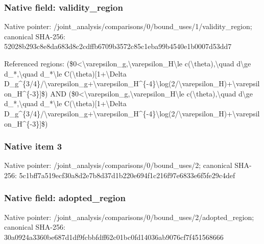 \documentclass[10pt,a4paper]{article}
\begin{document}
\subsubsection{Native field: validity\_\allowbreak{}region}
Native pointer: /joint\_\allowbreak{}analysis/comparisons/0/bound\_\allowbreak{}uses/1/validity\_\allowbreak{}region; canonical SHA-256: 52028b293c8e8da683d8c2cdffb6709b3572c85c1eba99b4540e1b0007d53dd7

\begingroup\raggedright\sloppy Referenced regions:\allowbreak{} (\$0<\textbackslash{}varepsilon\_\allowbreak{}g,\allowbreak{}\textbackslash{}varepsilon\_\allowbreak{}H\textbackslash{}le c(\textbackslash{}theta),\allowbreak{}\textbackslash{}quad d\textbackslash{}ge d\_\allowbreak{}*,\allowbreak{}\textbackslash{}quad d\_\allowbreak{}*\textbackslash{}le C(\textbackslash{}theta)[1+\textbackslash{}Delta D\_\allowbreak{}g\textasciicircum{}\{3/\allowbreak{}4\}/\allowbreak{}\textbackslash{}varepsilon\_\allowbreak{}g+\textbackslash{}varepsilon\_\allowbreak{}H\textasciicircum{}\{-4\}\textbackslash{}log(2/\allowbreak{}\textbackslash{}varepsilon\_\allowbreak{}H)+\textbackslash{}varepsilon\_\allowbreak{}H\textasciicircum{}\{-3\}]\$) AND (\$0<\textbackslash{}varepsilon\_\allowbreak{}g,\allowbreak{}\textbackslash{}varepsilon\_\allowbreak{}H\textbackslash{}le c(\textbackslash{}theta),\allowbreak{}\textbackslash{}quad d\textbackslash{}ge d\_\allowbreak{}*,\allowbreak{}\textbackslash{}quad d\_\allowbreak{}*\textbackslash{}le C(\textbackslash{}theta)[1+\textbackslash{}Delta D\_\allowbreak{}g\textasciicircum{}\{3/\allowbreak{}4\}/\allowbreak{}\textbackslash{}varepsilon\_\allowbreak{}g+\textbackslash{}varepsilon\_\allowbreak{}H\textasciicircum{}\{-4\}\textbackslash{}log(2/\allowbreak{}\textbackslash{}varepsilon\_\allowbreak{}H)+\textbackslash{}varepsilon\_\allowbreak{}H\textasciicircum{}\{-3\}]\$)\par\endgroup

\subsubsection{Native item 3}
Native pointer: /joint\_\allowbreak{}analysis/comparisons/0/bound\_\allowbreak{}uses/2; canonical SHA-256: 5c1bff7a519ecf30a8d2e7b8d37d1b220e694f1c216f97e6833e6f5fe29c4def

\subsubsection{Native field: adopted\_\allowbreak{}region}
Native pointer: /joint\_\allowbreak{}analysis/comparisons/0/bound\_\allowbreak{}uses/2/adopted\_\allowbreak{}region; canonical SHA-256: 30a0924a3360be687d1df9fcbbfdff62c01bc0fd14036ab9076cf7f451568666
\end{document}
